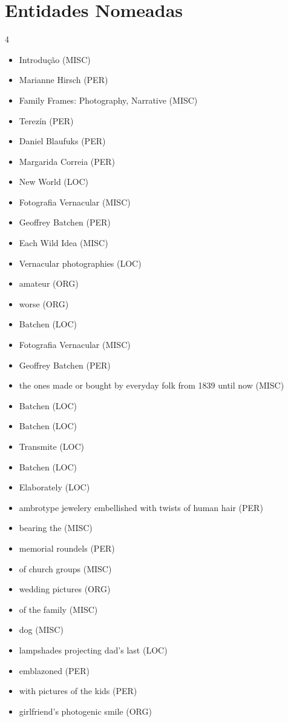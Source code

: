 \documentclass{article}
\begin{document}
\section*{Entidades Nomeadas}
\begin{multicols}{4}
\begin{itemize}
\item Introdução 
 (MISC)
\item Marianne  Hirsch (PER)
\item Family Frames: Photography, Narrative (MISC)
\item Terezín (PER)
\item Daniel  Blaufuks (PER)
\item Margarida Correia (PER)
\item New World (LOC)
\item Fotografia  Vernacular (MISC)
\item Geoffrey Batchen (PER)
\item Each Wild Idea (MISC)
\item Vernacular  photographies (LOC)
\item amateur (ORG)
\item worse (ORG)
\item Batchen (LOC)
\item Fotografia  Vernacular (MISC)
\item Geoffrey Batchen (PER)
\item the ones made or bought by everyday folk from 1839 until now (MISC)
\item Batchen (LOC)
\item Batchen (LOC)
\item Transmite (LOC)
\item Batchen (LOC)
\item Elaborately (LOC)
\item ambrotype jewelery embellished with twists 
of human hair (PER)
\item bearing the (MISC)
\item memorial roundels (PER)
\item of church groups (MISC)
\item wedding pictures (ORG)
\item of the family (MISC)
\item dog (MISC)
\item lampshades  projecting  dad’s  last (LOC)
\item emblazoned (PER)
\item with  pictures  of  the  kids (PER)
\item girlfriend’s photogenic smile (ORG)

\end{itemize}
\end{multicols}
\end{document}
